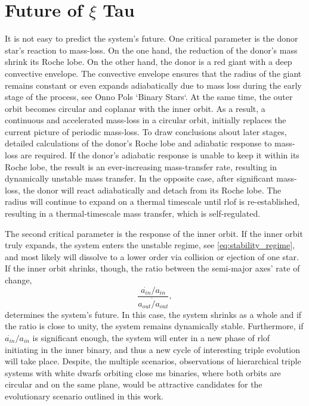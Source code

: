 \section{Future of $\xi$ Tau}\label{sec:discussion}

It is not easy to predict the system's future. One critical parameter is the donor star's reaction to mass-loss. On the one hand, the reduction of the donor's mass shrink its Roche lobe. On the other hand, the donor is a red giant with a deep convective envelope. The convective envelope ensures that the radius of the giant remains constant or even expands adiabatically due to mass loss during the early stage of the process, see Onno Pols `Binary Stars`. At the same time, the outer orbit becomes circular and coplanar with the inner orbit. As a result, a continuous and accelerated mass-loss in a circular orbit, initially replaces the current picture of periodic mass-loss. To draw conclusions about later stages, detailed calculations of the donor's Roche lobe and adiabatic response to mass-loss are required. If the donor's adiabatic response is unable to keep it within its Roche lobe, the result is an ever-increasing mass-transfer rate, resulting in dynamically unstable mass transfer. In the opposite case, after significant mass-loss, the donor will react adiabatically and detach from its Roche lobe. The radius will continue to expand on a thermal timescale until \ac{rlof} is re-established, resulting in a thermal-timescale mass transfer, which is self-regulated.

The second critical parameter is the response of the inner orbit. If the inner orbit truly expands, the system enters the unstable regime, see \cref{eq:stability_regime}, and most likely will dissolve to a lower order via collision or ejection of one star. If the inner orbit shrinks, though, the ratio between the semi-major axes' rate of change,
\begin{equation}
    \frac{\dot{a_{in}}/a_{in}}{\dot{a_{out}/a_{out}}},
\end{equation}
determines the system's future. In this case, the system shrinks as a whole and if the ratio is close to unity, the system remains dynamically stable. Furthermore, if $\dot{a_{in}}/a_{in}$ is significant enough, the system will enter in a new phase of \ac{rlof} initiating in the inner binary, and thus a new cycle of interesting triple evolution will take place. Despite, the multiple scenarios, observations of hierarchical triple systems with white dwarfs orbiting close \ac{ms} binaries, where both orbits are circular and on the same plane, would be attractive candidates for the evolutionary scenario outlined in this work.


